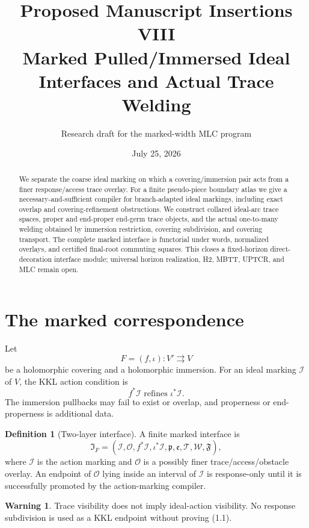 \documentclass[11pt]{article}
\title{Proposed Manuscript Insertions VIII\\
Marked Pulled/Immersed Ideal Interfaces and Actual Trace Welding}
\author{Research draft for the marked-width MLC program}
\date{July 25, 2026}
\theoremstyle{definition}
\newtheorem{definition}[theorem]{Definition}
\newtheorem{warning}[theorem]{Warning}
\theoremstyle{remark}
\begin{document}
\maketitle

\begin{abstract}
We separate the coarse ideal marking on which a covering/immersion pair acts
from a finer response/access trace overlay.  For a finite pseudo-piece boundary
atlas we give a necessary-and-sufficient compiler for branch-adapted ideal
markings, including exact overlap and covering-refinement obstructions.  We
construct collared ideal-arc trace spaces, proper and end-proper end-germ trace
objects, and the actual one-to-many welding obtained by immersion restriction,
covering subdivision, and covering transport.  The complete marked interface
is functorial under words, normalized overlays, and certified final-root
commuting squares.  This closes a fixed-horizon direct-decoration interface
module; universal horizon realization, H2, MBTT, UPTCR, and MLC remain open.
\end{abstract}

\section{The marked correspondence}
Let
\[
 F=(f,\iota):V'\rightrightarrows V
\]
be a holomorphic covering and a holomorphic immersion.  For an ideal marking
$\mathcal I$ of $V$, the KKL action condition is
\[
 \boxed{f^*\mathcal I\text{ refines }\iota^*\mathcal I.}
 \tag{1.1}
\]
The immersion pullbacks may fail to exist or overlap, and properness or
end-properness is additional data.

\begin{definition}[Two-layer interface]
A finite marked interface is
\[
 \mathfrak I_F=(\mathcal I,\mathscr O,f^*\mathcal I,
 \iota^*\mathcal I,\mathfrak p,\mathfrak e,
 \mathcal T,\mathcal W,\mathfrak F),
\]
where $\mathcal I$ is the action marking and $\mathscr O$ is a possibly finer
trace/access/obstacle overlay.  An endpoint of $\mathscr O$ lying inside an
interval of $\mathcal I$ is response-only until it is successfully promoted by
the action-marking compiler.
\end{definition}

\begin{warning}
Trace visibility does not imply ideal-action visibility.  No response
subdivision is used as a KKL endpoint without proving (1.1).
\end{warning}
\end{document}
